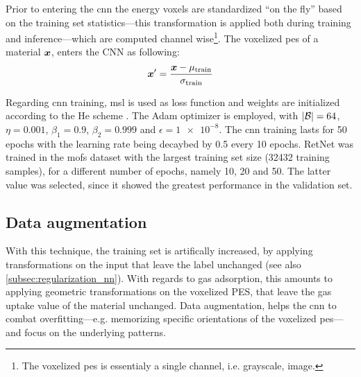 Prior to entering the \gls{cnn} the energy voxels are standardized ``on the
fly'' based on the training set statistics---this transformation is applied both
during training and inference---which are computed channel wise\footnote{The
voxelized \gls{pes} is essentialy a single channel, i.e. grayscale,
image.}. The voxelized \gls{pes} of a material $\boldsymbol{x}$,
enters the CNN as following:
\begin{equation}
	\boldsymbol{x}' = \frac{\boldsymbol{x} - \mu_\text{train}}{\sigma_\text{train}}
\end{equation}

Regarding \gls{cnn} training, \gls{msl} is used as loss
function and weights are initialized according to the He scheme
\parencite{He2015}. The Adam optimizer \parencite{Kingma2017} is employed, with
$\lvert\mathcal{B}\rvert = \num{64}$, $\eta = \num{0.001}$, $\beta_1 = \num{0.9}$,
$\beta_2 = \num{0.999}$ and $\epsilon = \num{1e-8}$. The \gls{cnn} training lasts for
\num{50} epochs with the learning rate being decaybed by \num{0.5} every
\num{10} epochs. RetNet was trained in the \glspl{mof} dataset with
the largest training set size (\num{32432} training samples), for a different
number of epochs, namely \num{10}, \num{20} and \num{50}. The latter value was
selected, since it showed the greatest performance in the validation
set.

\subsection{Data augmentation}
\label{subsec:data_augmentation}

With this technique, the training set is artifically
increased, by applying transformations on the
input that leave the label unchanged (see also \Section{}
\ref{subsec:regularization_nn}). With regards to gas adsorption, this amounts to
applying geometric transformations on the voxelized PES, that leave the gas
uptake value of the material unchanged. Data augmentation, helps the \gls{cnn}
to combat overfitting---e.g. memorizing specific orientations
of the voxelized \gls{pes}---and focus on the underlying patterns.

